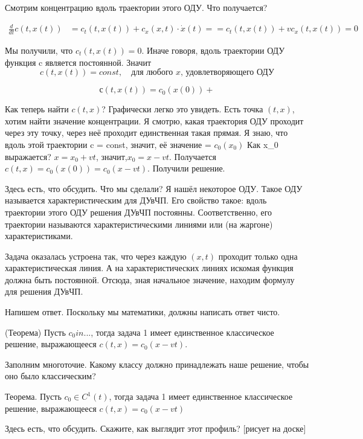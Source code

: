Смотрим концентрацию вдоль траектории этого ОДУ. Что получается?

\begin{align*}
    \frac {d} {dt} c (t, x(t)) & = c_t (t, x(t)) + c_x (x, t) \cdot \dot x (t) = = c_t (t, x(t)) + v c_x (t, x(t)) = 0
\end{align*}

Мы получили, что $ c_t (t,x(t)) = 0 $. Иначе говоря, вдоль траектории ОДУ функция c является постоянной.
Значит
$$ c(t,x(t)) = const,\quad \text{для любого } x \text{, удовлетворяющего ОДУ}$$

$$с(t,x(t)) = c_0(x(0)) + $$

Как теперь найти $c(t,x)$? Графически легко это увидеть.
Есть точка $(t,x)$, хотим найти значение концентрации. Я смотрю, какая траектория ОДУ проходит через эту точку, через неё проходит единственная такая прямая. Я знаю, что вдоль этой траектории c = const, значит, её значение = $c_0(x_0)$
Как x_0 выражается? $x = x_0 + vt$, значит,$ x_0 = x - vt$.
Получается $c(t,x) = c_0(x(0)) = c_0(x-vt)$. Получили решение.

Здесь есть, что обсудить. Что мы сделали? Я нашёл некоторое ОДУ. Такое ОДУ называется характеристическим для ДУвЧП. Его свойство такое: вдоль траектории этого ОДУ решения ДУвЧП постоянны. Соответственно, его траектории называются характеристическими линиями или (на жаргоне) характеристиками.

Задача оказалась устроена так, что через каждую $(x,t)$ проходит только одна характеристическая линия. А на характеристических линиях искомая функция должна быть постоянной. Отсюда, зная начальное значение, находим формулу для решения ДУвЧП.

Напишем ответ. Поскольку мы математики, должны написать ответ чисто.

\begin{note} (Теорема) Пусть $c_0 in ...$, тогда задача 1 имеет единственное классическое решение, выражающееся $c(t,x) = c_0(x - vt)$.
\end{note}
Заполним многоточие. Какому классу должно принадлежать наше решение, чтобы оно было классическим? 

\begin{theorem}
Теорема. Пусть $c_0 \in C^1(t)$, тогда задача 1 имеет единственное классическое решение, выражающееся $c(t,x) = c_0(x - vt)$
\end{theorem}

Здесь есть, что обсудить. Скажите, как выглядит этот профиль? [рисует на доске]

